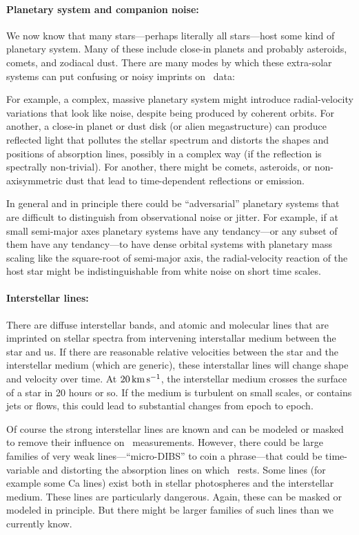 \documentclass[12pt, fullpage, letterpaper]{article}
\begin{document}
\paragraph{Planetary system and companion noise:}
We now know that many stars---perhaps literally all stars---host some
kind of planetary system.
Many of these include close-in planets and probably asteroids, comets,
and zodiacal dust.
There are many modes by which these extra-solar systems can put
confusing or noisy imprints on \EPRV\ data:

For example, a complex, massive planetary system might introduce
radial-velocity variations that look like noise, despite being
produced by coherent orbits.
For another, a close-in planet or dust disk (or alien
megastructure) can produce reflected light that pollutes the stellar
spectrum and distorts the shapes and positions of absorption lines,
possibly in a complex way (if the reflection is spectrally
non-trivial).
For another, there might be comets, asteroids, or non-axisymmetric
dust that lead to time-dependent reflections or emission.

In general and in principle there could be ``adversarial'' planetary
systems that are difficult to distinguish from observational noise or
jitter.
For example,
if at small semi-major axes planetary systems have any tendancy---or
any subset of them have any tendancy---to have dense orbital systems
with planetary mass scaling like the square-root of semi-major axis,
the radial-velocity reaction of the host star might be indistinguishable
from white noise on short time scales.

\paragraph{Interstellar lines:}
There are diffuse interstellar bands, and atomic and molecular lines
that are imprinted on stellar spectra from intervening interstallar
medium between the star and us.
If there are reasonable relative velocities between the star and the
interstellar medium (which are generic), these interstallar lines will
change shape and velocity over time.
At $20\,{\mathrm{km\,s^{-1}}}$, the interstellar medium crosses the surface of a star
in 20 hours or so. If the medium is turbulent on small scales, or contains
jets or flows, this
could lead to substantial changes from epoch to epoch.

Of course the strong interstellar lines are known and can be modeled or masked
to remove their influence on \EPRV\ measurements.
However, there could be large families of very weak
lines---``micro-DIBS'' to coin a phrase---that could be time-variable
and distorting the absorption lines on which \EPRV\ rests.
Some lines (for example some Ca lines) exist both in stellar photospheres
and the interstellar medium. These lines are particularly dangerous.
Again, these can be masked or modeled in principle. But there might be
larger families of such lines than we currently know.
\end{document}
